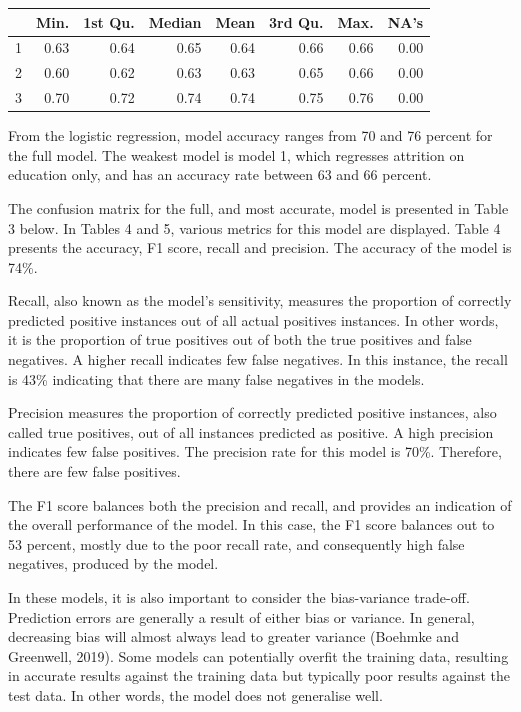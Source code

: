 \documentclass[11pt,preprint, authoryear]{elsarticle}
\let\origtable\table
\let\endorigtable\endtable
\renewenvironment{table}[1][2] {
    \expandafter\origtable\expandafter[H]
} {
    \endorigtable
}
\numberwithin{equation}{section}
\numberwithin{figure}{section}
\numberwithin{table}{section}
\begin{document}
\begin{table}[H]
\centering
\begin{tabular}{rrrrrrrr}
  \hline
 & Min. & 1st Qu. & Median & Mean & 3rd Qu. & Max. & NA's \\ 
  \hline
1 & 0.63 & 0.64 & 0.65 & 0.64 & 0.66 & 0.66 & 0.00 \\ 
  2 & 0.60 & 0.62 & 0.63 & 0.63 & 0.65 & 0.66 & 0.00 \\ 
  3 & 0.70 & 0.72 & 0.74 & 0.74 & 0.75 & 0.76 & 0.00 \\ 
   \hline
\end{tabular}
\caption{Accuracy across logistic models \label{tab1}} 
\end{table}

From the logistic regression, model accuracy ranges from 70 and 76
percent for the full model. The weakest model is model 1, which
regresses attrition on education only, and has an accuracy rate between
63 and 66 percent.

The confusion matrix for the full, and most accurate, model is presented
in Table 3 below. In Tables 4 and 5, various metrics for this model are
displayed. Table 4 presents the accuracy, F1 score, recall and
precision. The accuracy of the model is 74\%.

Recall, also known as the model's sensitivity, measures the proportion
of correctly predicted positive instances out of all actual positives
instances. In other words, it is the proportion of true positives out of
both the true positives and false negatives. A higher recall indicates
few false negatives. In this instance, the recall is 43\% indicating
that there are many false negatives in the models.

Precision measures the proportion of correctly predicted positive
instances, also called true positives, out of all instances predicted as
positive. A high precision indicates few false positives. The precision
rate for this model is 70\%. Therefore, there are few false positives.

The F1 score balances both the precision and recall, and provides an
indication of the overall performance of the model. In this case, the F1
score balances out to 53 percent, mostly due to the poor recall rate,
and consequently high false negatives, produced by the model.

In these models, it is also important to consider the bias-variance
trade-off. Prediction errors are generally a result of either bias or
variance. In general, decreasing bias will almost always lead to greater
variance (Boehmke and Greenwell, 2019). Some models can potentially
overfit the training data, resulting in accurate results against the
training data but typically poor results against the test data. In other
words, the model does not generalise well.
\end{document}
